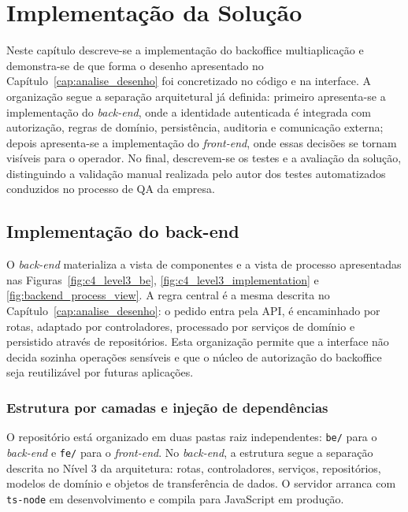 \chapter{Implementação da Solução}
\label{cap:implementação}

Neste capítulo descreve-se a implementação do backoffice multiaplicação e demonstra-se de que forma o desenho apresentado no Capítulo~\ref{cap:analise_desenho} foi concretizado no código e na interface. A organização segue a separação arquitetural já definida: primeiro apresenta-se a implementação do \textit{back-end}, onde a identidade autenticada é integrada com autorização, regras de domínio, persistência, auditoria e comunicação externa; depois apresenta-se a implementação do \textit{front-end}, onde essas decisões se tornam visíveis para o operador. No final, descrevem-se os testes e a avaliação da solução, distinguindo a validação manual realizada pelo autor dos testes automatizados conduzidos no processo de \gls{QA} da empresa.


\section{Implementação do back-end}
\label{sec:impl_backend}

O \textit{back-end} materializa a vista de componentes e a vista de processo apresentadas nas Figuras~\ref{fig:c4_level3_be}, \ref{fig:c4_level3_implementation} e \ref{fig:backend_process_view}. A regra central é a mesma descrita no Capítulo~\ref{cap:analise_desenho}: o pedido entra pela \gls{API}, é encaminhado por rotas, adaptado por controladores, processado por serviços de domínio e persistido através de repositórios. Esta organização permite que a interface não decida sozinha operações sensíveis e que o núcleo de autorização do backoffice seja reutilizável por futuras aplicações.

\subsection{Estrutura por camadas e injeção de dependências}
\label{sec:ambiente_infraestrutura}

O repositório está organizado em duas pastas raiz independentes: \texttt{be/} para o \textit{back-end} e \texttt{fe/} para o \textit{front-end}. No \textit{back-end}, a estrutura segue a separação descrita no Nível 3 da arquitetura: rotas, controladores, serviços, repositórios, modelos de domínio e objetos de transferência de dados. O servidor arranca com \texttt{ts-node} em desenvolvimento e compila para JavaScript em produção.

